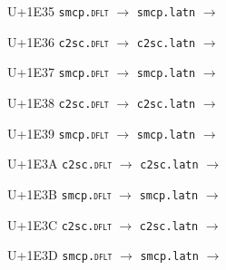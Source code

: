 \documentclass{article}
\begin{document}
\begin{substitutions}
\goodbreak

U+1E35  \linebreak
    \texttt{smcp.\textsc{dflt}} $\to$  \linebreak
    \texttt{smcp.latn} $\to$  

\goodbreak

U+1E36  \linebreak
    \texttt{c2sc.\textsc{dflt}} $\to$  \linebreak
    \texttt{c2sc.latn} $\to$  

\goodbreak

U+1E37  \linebreak
    \texttt{smcp.\textsc{dflt}} $\to$  \linebreak
    \texttt{smcp.latn} $\to$  

\goodbreak

U+1E38  \linebreak
    \texttt{c2sc.\textsc{dflt}} $\to$  \linebreak
    \texttt{c2sc.latn} $\to$  

\goodbreak

U+1E39  \linebreak
    \texttt{smcp.\textsc{dflt}} $\to$  \linebreak
    \texttt{smcp.latn} $\to$  

\goodbreak

U+1E3A  \linebreak
    \texttt{c2sc.\textsc{dflt}} $\to$  \linebreak
    \texttt{c2sc.latn} $\to$  

\goodbreak

U+1E3B  \linebreak
    \texttt{smcp.\textsc{dflt}} $\to$  \linebreak
    \texttt{smcp.latn} $\to$  

\goodbreak

U+1E3C  \linebreak
    \texttt{c2sc.\textsc{dflt}} $\to$  \linebreak
    \texttt{c2sc.latn} $\to$  

\goodbreak

U+1E3D  \linebreak
    \texttt{smcp.\textsc{dflt}} $\to$  \linebreak
    \texttt{smcp.latn} $\to$  


\end{substitutions}
\end{document}
